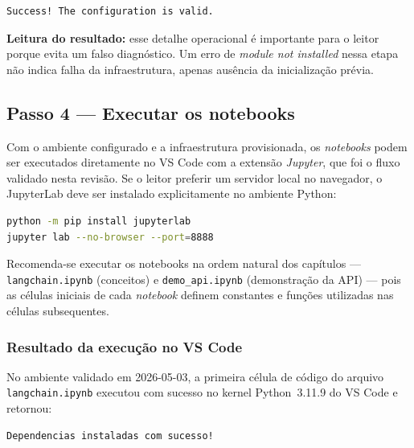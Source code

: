 \begin{lstlisting}[language=bash,
      caption={Sa\'ida do \\texttt{terraform validate} ap\'os a inicializa\c{c}\~ao.},
      label={lst:cap2_terraform_validate_output}]
Success! The configuration is valid.
\end{lstlisting}

\noindent\textbf{Leitura do resultado:} esse detalhe operacional \'e
importante para o leitor porque evita um falso diagn\'ostico. Um erro de
\textit{module not installed} nessa etapa n\~ao indica falha da
infraestrutura, apenas aus\^encia da inicializa\c{c}\~ao pr\'evia.

\subsection{Passo 4 --- Executar os notebooks}

Com o ambiente configurado e a infraestrutura provisionada, os
\textit{notebooks} podem ser executados diretamente no VS Code com a
extens\~ao \textit{Jupyter}, que foi o fluxo validado nesta revis\~ao. Se
o leitor preferir um servidor local no navegador, o JupyterLab deve ser
instalado explicitamente no ambiente Python:

\begin{lstlisting}[language=bash,
      caption={Fluxo opcional para iniciar um servidor local do JupyterLab.},
  label={lst:jupyter_start}]
python -m pip install jupyterlab
jupyter lab --no-browser --port=8888
\end{lstlisting}

Recomenda-se executar os notebooks na ordem natural dos cap\'itulos ---
\texttt{langchain.ipynb} (conceitos) e \texttt{demo\_api.ipynb}
(demonstra\c{c}\~ao da API) --- pois as c\'elulas iniciais de cada
\textit{notebook} definem constantes e fun\c{c}\~oes utilizadas
nas c\'elulas subsequentes.

\subsubsection*{Resultado da execu\c{c}\~ao no VS Code}

No ambiente validado em 2026-05-03, a primeira c\'elula de c\'odigo do
arquivo \texttt{langchain.ipynb} executou com sucesso no kernel
Python~3.11.9 do VS Code e retornou:

\begin{lstlisting}[language=bash,
      caption={Sa\'ida da primeira c\'elula do notebook principal no VS Code.},
      label={lst:cap2_notebook_output}]
Dependencias instaladas com sucesso!
\end{lstlisting}

